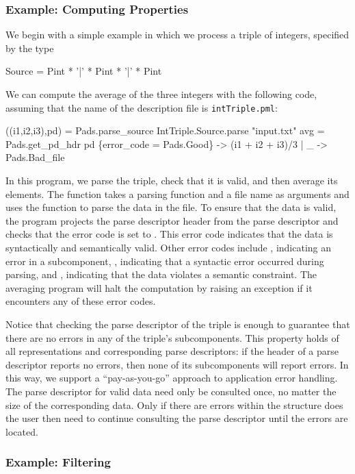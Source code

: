 \subsubsection{Example: Computing Properties}
\label{sec:ex-process}
We begin with a simple example in which we process a triple of
integers, specified by the type
\begin{code}\scriptsize
{} Source = Pint * '|' * Pint * '|' * Pint\end{code}%
We can compute the average of the three integers with the following
\ocaml{} code, assuming that the name of the description file
is \texttt{intTriple.pml}:
\begin{code}\scriptsize
{} ((i1,i2,i3),pd) = 
    Pads.parse_source IntTriple.Source.parse "input.txt"
 avg =  Pads.get_pd_hdr pd 
    \{error_code = Pads.Good\} -> (i1 + i2 + i3)/3
  | _ ->  Pads.Bad_file \end{code}%
\noindent
In this program, we parse the triple, check that it is valid, and then
average its elements. The function  takes a parsing
function and a file name as arguments and uses the function to parse
the data in the file. 
To ensure that the data is
valid, the program projects the parse descriptor header from the parse
descriptor  and checks that the error code is set to .
This error code indicates that
the data is syntactically and semantically valid. Other error codes
include , indicating an error in a subcomponent, ,
indicating that a syntactic error occurred during parsing, and
, indicating that the data violates a semantic 
constraint. The averaging program will halt the computation by raising
an exception if it encounters any of these error codes. 

Notice that checking the parse descriptor of the triple is enough to
guarantee that there are no errors in any of the triple's
subcomponents. This property holds of all representations
and corresponding parse descriptors: if the header of a parse
descriptor reports no errors, then none of its subcomponents will
report errors. In this way, we support a ``pay-as-you-go'' approach to
application error handling. The parse descriptor for valid data
need only be consulted once, no matter the size of the corresponding
data. Only if there are errors within the structure does the user then
need to continue consulting the parse descriptor until the errors are
located.

\subsubsection{Example: Filtering}
\label{sec:ex-filter}

